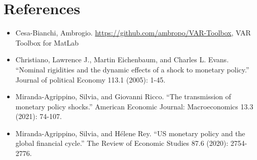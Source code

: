 \documentclass[11pt,a4paper]{article}
\begin{document}
\section*{References}
\begin{itemize}
    \item Cesa-Bianchi, Ambrogio. \url{https://github.com/ambropo/VAR-Toolbox}, VAR Toolbox for MatLab
    \item Christiano, Lawrence J., Martin Eichenbaum, and Charles L. Evans. \enquote{Nominal rigidities and the dynamic effects of a shock to monetary policy.} Journal of political Economy 113.1 (2005): 1-45.
    \item Miranda-Agrippino, Silvia, and Giovanni Ricco. \enquote{The transmission of monetary policy shocks.} American Economic Journal: Macroeconomics 13.3 (2021): 74-107.
    \item Miranda-Agrippino, Silvia, and Hélene Rey. \enquote{US monetary policy and the global financial cycle.} The Review of Economic Studies 87.6 (2020): 2754-2776.
    
\end{itemize}
\end{document}
